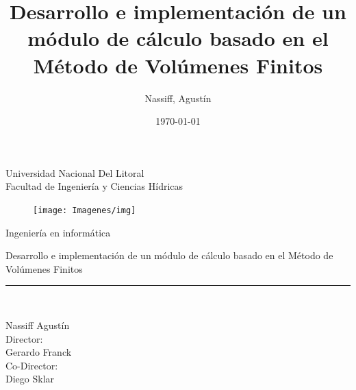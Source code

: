 \documentclass[a4paper,10pt, oneside]{book}
\title{Desarrollo e implementación de un módulo de cálculo basado en el Método de Volúmenes Finitos}
\author{Nassiff, Agustín}
\date{\today}
\begin{document}
\begin{titlepage}

\begin{center}
  \vspace*{0.5in}

  \begin{Large}
    Universidad Nacional Del Litoral\\
    \vspace*{0.15in}
    Facultad de Ingeniería y Ciencias Hídricas\\
    \vspace*{0.3in}
  \end{Large}
  
  \begin{figure}[htb]
    \begin{center}
      \texttt{[image: Imagenes/img]}
    \end{center}
  \end{figure}

  \vspace*{0.15in}
  \begin{large}
    Ingeniería en informática\\
  \end{large}
  
  \vspace*{0.25in}
  \begin{LARGE}
    Desarrollo e implementación de un módulo de cálculo basado en el Método de Volúmenes Finitos \\
  \end{LARGE}

  \vspace*{0.25in}
  \rule{80mm}{0.1mm}\\
  \vspace*{0.24in}

  \begin{large}
    Nassiff Agustín\\
    \vspace*{0.15in}
    Director: \\
    Gerardo Franck \\
    \vspace*{0.15in}
    Co-Director: \\
    Diego Sklar \\
  \end{large}

\end{center}

\end{titlepage}
\end{document}
